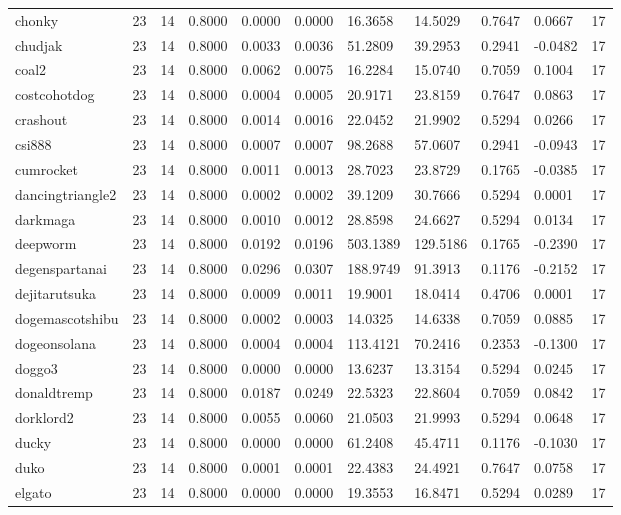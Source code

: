 \begin{table}[htbp]
\begin{tabular}{lllllllllll}
chonky & 23 & 14 & 0.8000 & 0.0000 & 0.0000 & 16.3658 & 14.5029 & 0.7647 & 0.0667 & 17 \\
chudjak & 23 & 14 & 0.8000 & 0.0033 & 0.0036 & 51.2809 & 39.2953 & 0.2941 & -0.0482 & 17 \\
coal2 & 23 & 14 & 0.8000 & 0.0062 & 0.0075 & 16.2284 & 15.0740 & 0.7059 & 0.1004 & 17 \\
costcohotdog & 23 & 14 & 0.8000 & 0.0004 & 0.0005 & 20.9171 & 23.8159 & 0.7647 & 0.0863 & 17 \\
crashout & 23 & 14 & 0.8000 & 0.0014 & 0.0016 & 22.0452 & 21.9902 & 0.5294 & 0.0266 & 17 \\
csi888 & 23 & 14 & 0.8000 & 0.0007 & 0.0007 & 98.2688 & 57.0607 & 0.2941 & -0.0943 & 17 \\
cumrocket & 23 & 14 & 0.8000 & 0.0011 & 0.0013 & 28.7023 & 23.8729 & 0.1765 & -0.0385 & 17 \\
dancingtriangle2 & 23 & 14 & 0.8000 & 0.0002 & 0.0002 & 39.1209 & 30.7666 & 0.5294 & 0.0001 & 17 \\
darkmaga & 23 & 14 & 0.8000 & 0.0010 & 0.0012 & 28.8598 & 24.6627 & 0.5294 & 0.0134 & 17 \\
deepworm & 23 & 14 & 0.8000 & 0.0192 & 0.0196 & 503.1389 & 129.5186 & 0.1765 & -0.2390 & 17 \\
degenspartanai & 23 & 14 & 0.8000 & 0.0296 & 0.0307 & 188.9749 & 91.3913 & 0.1176 & -0.2152 & 17 \\
dejitarutsuka & 23 & 14 & 0.8000 & 0.0009 & 0.0011 & 19.9001 & 18.0414 & 0.4706 & 0.0001 & 17 \\
dogemascotshibu & 23 & 14 & 0.8000 & 0.0002 & 0.0003 & 14.0325 & 14.6338 & 0.7059 & 0.0885 & 17 \\
dogeonsolana & 23 & 14 & 0.8000 & 0.0004 & 0.0004 & 113.4121 & 70.2416 & 0.2353 & -0.1300 & 17 \\
doggo3 & 23 & 14 & 0.8000 & 0.0000 & 0.0000 & 13.6237 & 13.3154 & 0.5294 & 0.0245 & 17 \\
donaldtremp & 23 & 14 & 0.8000 & 0.0187 & 0.0249 & 22.5323 & 22.8604 & 0.7059 & 0.0842 & 17 \\
dorklord2 & 23 & 14 & 0.8000 & 0.0055 & 0.0060 & 21.0503 & 21.9993 & 0.5294 & 0.0648 & 17 \\
ducky & 23 & 14 & 0.8000 & 0.0000 & 0.0000 & 61.2408 & 45.4711 & 0.1176 & -0.1030 & 17 \\
duko & 23 & 14 & 0.8000 & 0.0001 & 0.0001 & 22.4383 & 24.4921 & 0.7647 & 0.0758 & 17 \\
elgato & 23 & 14 & 0.8000 & 0.0000 & 0.0000 & 19.3553 & 16.8471 & 0.5294 & 0.0289 & 17 \\

\end{tabular}
\end{table}
